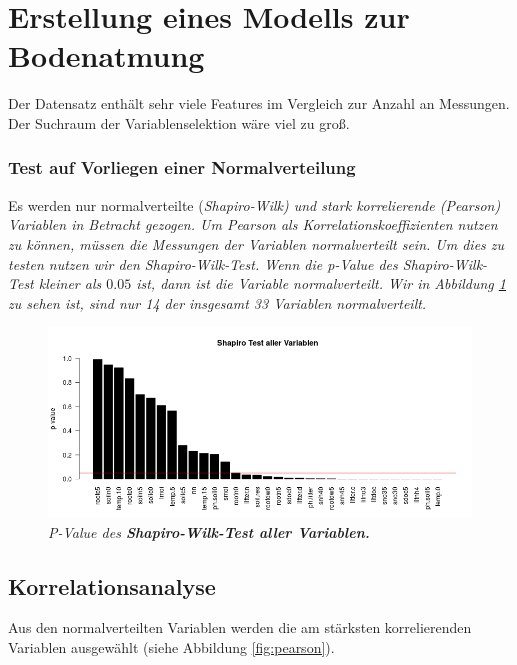 \section{Erstellung eines Modells zur Bodenatmung}
\label{sec-model}

Der Datensatz enthält sehr viele Features im Vergleich zur Anzahl an Messungen. Der Suchraum der Variablenselektion wäre viel zu groß.

\subsubsection{Test auf Vorliegen einer Normalverteilung}

Es werden nur normalverteilte (\it{Shapiro-Wilk}) und stark korrelierende (\it{Pearson}) Variablen in Betracht gezogen. Um \it{Pearson} als Korrelationskoeffizienten nutzen zu können, müssen die Messungen der Variablen normalverteilt sein. Um dies zu testen nutzen wir den \it{Shapiro-Wilk-Test}. Wenn die \it{p-Value} des \it{Shapiro-Wilk-Test} kleiner als $0.05$ ist, dann ist die Variable normalverteilt. Wir in Abbildung \ref{fig:shapiro} zu sehen ist, sind nur 14 der insgesamt 33 Variablen normalverteilt.

\begin{figure}[ht]
	\centering
	\includegraphics[width=\textwidth]{fig/model/normalverteilung-shapiro.png}
	\caption{\it{P-Value} des \bf{Shapiro-Wilk-Test} aller Variablen.}
	\label{fig:shapiro}
\end{figure}

\subsection{Korrelationsanalyse}

Aus den normalverteilten Variablen werden die am stärksten korrelierenden Variablen ausgewählt (siehe Abbildung \ref{fig:pearson}). 

